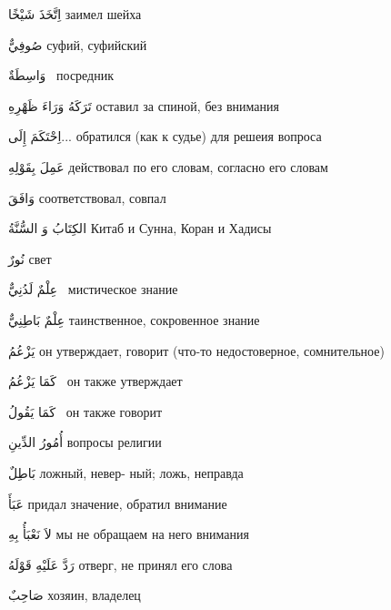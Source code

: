 \documentclass[a5paper]{article}
\newcommand\textstyleDropCaps[1]{#1}
\newcommand\textstyleCaptioncharacters[1]{#1}
\begin{document}
\textstyleCaptioncharacters{اِتَّخَذَ شَيْخًا }\textstyleDropCaps{заимел шей­ха‎}

\textstyleCaptioncharacters{صُوفِيٌّ }\textstyleDropCaps{суфий, суфийский‎}

\textstyleCaptioncharacters{وَاسِطَةٌ \ }\textstyleDropCaps{посредник ‎}

\textstyleCaptioncharacters{تَرَكَهُ وَرَاءَ ظَهْرِهِ }\textstyleDropCaps{оста­вил за спиной, без внимания‎}

\textstyleCaptioncharacters{اِحْتَكَمَ إِلَى... }\textstyleDropCaps{обратился (как к судье) для решеия вопроса ‎}

\textstyleCaptioncharacters{عَمِلَ بِقَوْلِهِ }\textstyleDropCaps{действовал по его словам, согласно его словам‎}

\textstyleCaptioncharacters{وَافَقَ }\textstyleDropCaps{соответствовал, сов­пал‎}

\textstyleCaptioncharacters{الكِتَابُ وَ السُّنَّةُ }\textstyleDropCaps{Китаб и Сунна, Коран и Хадисы‎}

\textstyleCaptioncharacters{نُورٌ }\textstyleDropCaps{свет‎}

\textstyleCaptioncharacters{عِلْمٌ لَدُنِيٌّ \ }\textstyleDropCaps{мистическое знание ‎}

\textstyleCaptioncharacters{عِلْمٌ بَاطِنِيٌّ }\textstyleDropCaps{таинствен­ное, сокровенное знание‎}

\textstyleCaptioncharacters{يَزْعُمُ }\textstyleDropCaps{он утверждает, гово­рит (что-то недостоверное, сомнительное)‎}

\textstyleCaptioncharacters{كَمَا يَزْعُمُ \ }\textstyleDropCaps{он также утверждает ‎}

\textstyleCaptioncharacters{كَمَا يَقُولُ \ }\textstyleDropCaps{он также го­ворит ‎}

\textstyleCaptioncharacters{أُمُورُ الدِّينِ }\textstyleDropCaps{вопросы ре­лигии‎}

\textstyleCaptioncharacters{بَاطِلٌ }\textstyleDropCaps{ложный, невер- ный; ложь, неправда‎}

\textstyleCaptioncharacters{عَبَأَ }\textstyleDropCaps{придал значение, обра­тил внимание‎}

\textstyleCaptioncharacters{لاَ نَعْبَأُ بِهِ }\textstyleDropCaps{мы не обраща­ем на него внимания‎}

\textstyleCaptioncharacters{رَدَّ عَلَيْهِ قَوْلَهُ }\textstyleDropCaps{отверг, не принял его слова‎}

\textstyleCaptioncharacters{صَاحِبٌ }\textstyleDropCaps{хозяин, владелец‎}
\end{document}
